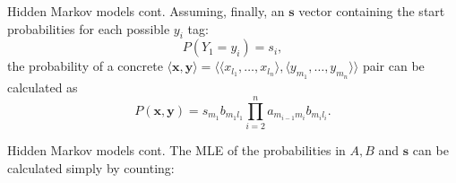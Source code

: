 \documentclass[style=upen, size=14pt]{powerdot}
\theoremstyle{definition}
\begin{document}
  \begin{slide}[toc=]{Hidden Markov models cont.}
    Assuming, finally, an $\mathbf{s}$ vector containing the start probabilities
    for each possible $y_i$ tag:
    $$
    P(Y_1 = y_i) = s_i,
    $$
    the probability of a concrete
    $\langle \mathbf{x}, \mathbf{y} \rangle =\langle \langle
    x_{l_1},\dots,x_{l_n} \rangle, \langle y_{m_1},\dots,y_{m_n} \rangle
    \rangle$ pair can be calculated as
    $$
    P(\mathbf{x}, \mathbf{y}) = s_{m_1} b_{m_1 l_1}
    \prod_{i=2}^na_{m_{i-1} m_i}b_{m_i l_i}.
    $$
  \end{slide}

  \begin{slide}[toc=]{Hidden Markov models cont.}
    The MLE of the probabilities in $A, B$ and $\mathbf{s}$ can be calculated
    simply by counting:

  \end{slide}
  
\end{document}
